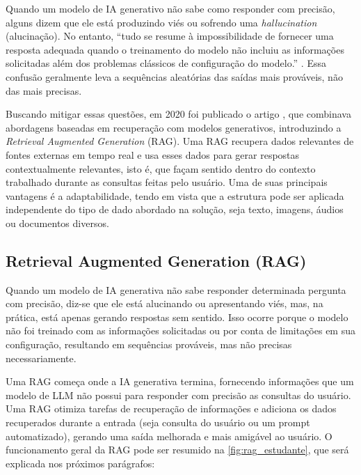 \documentclass[a4paper, 12pt]{article}
\newcommand{\citeb}[1]{\bibleftbracket\cite{#1}\bibrightbracket}
\begin{document}
    Quando um modelo de IA generativo não sabe como responder com precisão, alguns dizem que ele está produzindo viés ou sofrendo uma \textit{hallucination} (alucinação). No entanto, ``tudo se resume à impossibilidade de fornecer uma resposta adequada quando o treinamento do modelo não incluiu as informações solicitadas além dos problemas clássicos de configuração do modelo.'' \citeb{rothman}. Essa confusão geralmente leva a sequências aleatórias das saídas mais prováveis, não das mais precisas.

    Buscando mitigar essas questões, em 2020 foi publicado o artigo  \citeb{RAG}, que combinava abordagens baseadas em recuperação com modelos generativos, introduzindo a \textit{Retrieval Augmented Generation} (RAG). Uma RAG recupera dados relevantes de fontes externas em tempo real e usa esses dados para gerar respostas contextualmente relevantes, isto é, que façam sentido dentro do contexto trabalhado durante as consultas feitas pelo usuário. Uma de suas principais vantagens é a adaptabilidade, tendo em vista que a estrutura pode ser aplicada independente do tipo de dado abordado na solução, seja texto, imagens, áudios ou documentos diversos.


    \subsection{Retrieval Augmented Generation (RAG)}
    
    Quando um modelo de IA generativa não sabe responder determinada pergunta com precisão, diz-se que ele está alucinando ou apresentando viés, mas, na prática, está apenas gerando respostas sem sentido. Isso ocorre porque o modelo não foi treinado com as informações solicitadas ou por conta de limitações em sua configuração, resultando em sequências prováveis, mas não precisas necessariamente.

    Uma RAG começa onde a IA generativa termina, fornecendo informações que um modelo de LLM não possui para responder com precisão as consultas do usuário. Uma RAG otimiza tarefas de recuperação de informações e adiciona os dados recuperados durante a entrada (seja consulta do usuário ou um prompt automatizado), gerando uma saída melhorada e mais amigável ao usuário. O funcionamento geral da RAG pode ser resumido na \autoref{fig:rag_estudante}, que será explicada nos próximos parágrafos:
\end{document}
